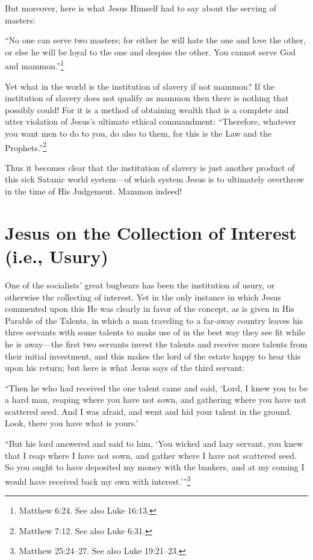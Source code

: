 \documentclass[letterpaper,12pt]{article}
\newenvironment{squote}
  {\small\quote}
  {\endquote\normalsize}
\newenvironment{squotation}
  {\small\quotation}
  {\endquotation\normalsize}
\begin{document}
But moreover, here is what Jesus Himself had to say about the serving of masters:

\begin{squote}
``No one can serve two masters; for either he will hate the one and love the other, or else he will be loyal to the one and despise the other. You cannot serve God and mammon.''\footnote{Matthew 6:24. See also Luke 16:13.}
\end{squote}

Yet what in the world is the institution of slavery if not mammon? If the institution of slavery does not qualify as mammon then there is nothing that possibly could! For it is a method of obtaining wealth that is a complete and utter violation of Jesus's ultimate ethical commandment: ``Therefore, whatever you want men to do to you, do also to them, for this is the Law and the Prophets.''\footnote{Matthew 7:12. See also Luke 6:31.}

Thus it becomes clear that the institution of slavery is just another product of this sick Satanic world system---of which system Jesus is to ultimately overthrow in the time of His Judgement. Mammon indeed!

\section{Jesus on the Collection of Interest (i.e., Usury)}
\label{sec:JesusOnTheCollectionOfInterestIEUsury}

One of the socialists' great bugbears has been the institution of usury, or otherwise the collecting of interest. Yet in the only instance in which Jesus commented upon this He was clearly in favor of the concept, as is given in His Parable of the Talents, in which a man traveling to a far-away country leaves his three servants with some talents to make use of in the best way they see fit while he is away---the first two servants invest the talents and receive more talents from their initial investment, and this makes the lord of the estate happy to hear this upon his return; but here is what Jesus says of the third servant:

\begin{squotation}
``Then he who had received the one talent came and said, `Lord, I knew you to be a hard man, reaping where you have not sown, and gathering where you have not scattered seed. And I was afraid, and went and hid your talent in the ground. Look, there you have what is yours.'

``But his lord answered and said to him, `You wicked and lazy servant, you knew that I reap where I have not sown, and gather where I have not scattered seed. So you ought to have deposited my money with the bankers, and at my coming I would have received back my own with interest.'\thinspace''\footnote{Matthew 25:24--27. See also Luke 19:21--23.}
\end{squotation}
\end{document}
